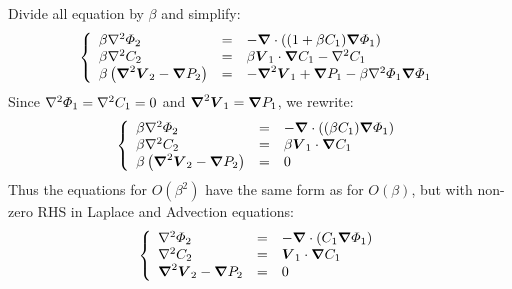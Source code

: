 Divide all equation by $\beta$ and simplify:
\begin{eqnarray}
 \brc{lll}{
  \beta \Laplacian \varPhi_2 &=& - \bnabla \cdot \brcs{(1 + \beta C_1) \bnabla \varPhi_1}
  \\
  \beta \Laplacian C_2 &=& \beta \bV_1 \cdot \bnabla C_1 -\Laplacian C_1
  \\
  \beta\brcs{\bLaplacian \bV_2 - \bnabla P_2} &=& - \bLaplacian \bV_1 + \bnabla P_1 - \beta \Laplacian \varPhi_1 \bnabla \varPhi_1}
\end{eqnarray}
Since $\Laplacian\varPhi_1 = \Laplacian C_1 = 0$ and $\bLaplacian \bV_1 = \bnabla P_1$, we rewrite:
\begin{eqnarray}
 \brc{lll}{
  \beta \Laplacian \varPhi_2 &=& - \bnabla \cdot \brcs{(\beta C_1) \bnabla \varPhi_1}
  \\
  \beta \Laplacian C_2 &=& \beta \bV_1 \cdot \bnabla C_1
  \\
  \beta\brcs{\bLaplacian \bV_2 - \bnabla P_2} &=& 0
 }
\end{eqnarray}
Thus the equations for $O(\beta^2)$ have the same form as for $O(\beta)$, but with non-zero RHS in Laplace and Advection equations:
\begin{eqnarray}
 \brc{lll}{
  \Laplacian \varPhi_2 &=& - \bnabla \cdot \brcs{C_1 \bnabla \varPhi_1}
  \\
  \Laplacian C_2 &=& \bV_1 \cdot \bnabla C_1
  \\
  \bLaplacian \bV_2 - \bnabla P_2 &=& 0
 }
\end{eqnarray}
